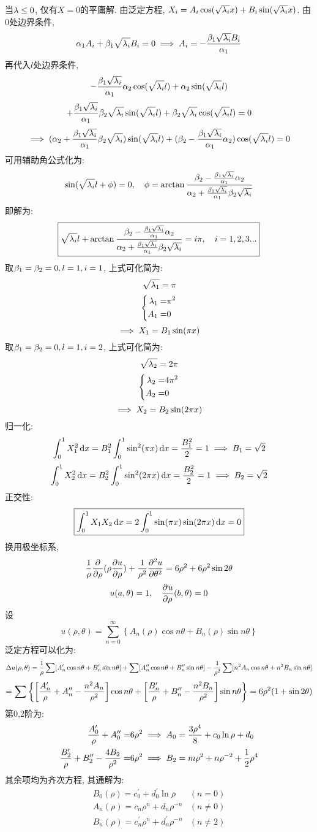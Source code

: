 \documentclass[UTF8,9pt]{ctexart}
\begin{document}
\newpage
{}
当$\lambda\leq 0$, 仅有$X=0$的平庸解. 
由泛定方程, $X_i=A_i\cos(\sqrt{\lambda_i}x)+B_i\sin(\sqrt{\lambda_i}x)$.
由0处边界条件, 
$$\alpha_1A_i +\beta_1\sqrt{\lambda_i}B_i = 0 \implies A_i = -\frac{\beta_1\sqrt{\lambda_i}B_i}{\alpha_1}$$
再代入$l$处边界条件,
$$-\frac{\beta_1\sqrt{\lambda_i}}{\alpha_1}\alpha_2\cos(\sqrt{\lambda_i}l)+\alpha_2\sin(\sqrt{\lambda_i}l)$$
$$+\frac{\beta_1\sqrt{\lambda_i}}{\alpha_1}\beta_2\sqrt{\lambda_i}\sin(\sqrt{\lambda_i}l)+\beta_2\sqrt{\lambda_i}\cos(\sqrt{\lambda_i}l)=0$$
$$\implies (\alpha_2+\frac{\beta_1\sqrt{\lambda_i}}{\alpha_1}\beta_2\sqrt{\lambda_i})\sin(\sqrt{\lambda_i}l)+(\beta_2-\frac{\beta_1\sqrt{\lambda_i}}{\alpha_1}\alpha_2)\cos(\sqrt{\lambda_i}l)=0$$
可用辅助角公式化为:
$$\sin(\sqrt{\lambda_i}l+\phi)=0,\quad \phi = \arctan\frac{\beta_2-\frac{\beta_1\sqrt{\lambda_i}}{\alpha_1}\alpha_2}{\alpha_2+\frac{\beta_1\sqrt{\lambda_i}}{\alpha_1}\beta_2\sqrt{\lambda_i}}$$
即解为: 
$$\boxed{ \sqrt{\lambda_i}l+\arctan\frac{\beta_2-\frac{\beta_1\sqrt{\lambda_i}}{\alpha_1}\alpha_2}{\alpha_2+\frac{\beta_1\sqrt{\lambda_i}}{\alpha_1}\beta_2\sqrt{\lambda_i}} = i\pi,\quad i=1,2,3...}$$
取$\beta_1=\beta_2=0,l=1,i=1$, 上式可化简为:
$$\sqrt{\lambda_1}=\pi$$
$$\left\{\begin{aligned} 
    \lambda_1=&\pi^2\\
    A_1=& 0
 \end{aligned}\right.$$
$$\implies X_1=B_1\sin(\pi x)$$
取$\beta_1=\beta_2=0,l=1,i=2$, 上式可化简为:
$$\sqrt{\lambda_2}=2\pi$$
$$\left\{\begin{aligned} 
    \lambda_2=&4\pi^2\\
    A_2=&0
 \end{aligned}\right.$$
$$\implies X_2=B_2\sin(2\pi x)$$
归一化:
$$\int_0^1 X_1^2\mathop{}\!\mathrm{d} x=B_1^2\int_0^1 \sin^2(\pi x)\mathop{}\!\mathrm{d} x = \frac{B_1^2}{2}=1 \implies B_1=\sqrt{2}$$
$$\int_0^1 X_2^2\mathop{}\!\mathrm{d} x=B_2^2\int_0^1 \sin^2(2\pi x)\mathop{}\!\mathrm{d} x = \frac{B_2^2}{2}=1 \implies B_2=\sqrt{2}$$
正交性: 
$$\boxed{ \int_0^1 X_1X_2 \mathop{}\!\mathrm{d} x=2\int_0^1 \sin(\pi x)\sin(2\pi x) \mathop{}\!\mathrm{d} x = 0 }$$
\newpage
{}
换用极坐标系, 
$$ 
\frac{1}{\rho} \frac{\partial}{\partial \rho}(\rho \frac{\partial u}{\partial \rho})+\frac{1}{\rho^{2}} \frac{\partial^{2} u}{\partial \theta^{2}} = 6\rho^2+6\rho^2\sin2\theta
 $$
$$u(a,\theta)=1,\quad \frac{\partial^{} u}{\partial {\rho}^{}}(b,\theta)=0$$
设
$$ 
u(\rho, \theta)=\sum_{n=0}^{\infty}\left\{A_{n}(\rho) \cos n \theta+B_{n}(\rho) \sin n \theta\right\}
 $$
泛定方程可以化为: 
$$\Delta u(\rho,\theta)=\frac{1}{\rho}\sum[A_n'\cos n\theta+B_n'\sin n\theta]+\sum[A_n''\cos n\theta+B_n''\sin n\theta]-\frac{1}{\rho^2}\sum[n^2A_n\cos n\theta+n^2B_n\sin n\theta]$$
$$=\sum\left\{ \left[\frac{A_n'}{\rho}+A_n''-\frac{n^2A_n}{\rho^2}\right]\cos n\theta + \left[\frac{B_n'}{\rho}+B_n''-\frac{n^2B_n}{\rho^2}\right]\sin n\theta  \right\} = 6\rho^2(1+\sin2\theta)$$
第0,2阶为: 
$$\begin{aligned} \frac{A_0'}{\rho}+A_0''=&\displaystyle 6\rho^2 \implies A_0=\frac{3\rho^4}{8}+c_0\ln\rho+d_0\\
\frac{B_2'}{\rho}+B_2''-\frac{4B_2}{\rho^2}=&6\rho^2 \implies B_2 = \displaystyle m\rho^{2}+n\rho^{-2}+\frac{1}{2}\rho^4
 \end{aligned}$$
其余项均为齐次方程, 其通解为:
$$ 
\begin{array}{ll}
{B_{0}(\rho)=c_{0}^{\prime}+d_{0}^{\prime} \ln \rho} & {(n=0)} \\ 
{A_{n}(\rho)=c_{n} \rho^{n}+d_{n} \rho^{-n}} & {(n \neq 0)} \\ 
{B_{n}(\rho)=c_{n}^{\prime} \rho^{n}+d_{n}^{\prime} \rho^{-n}} & {(n \neq 2)}
\end{array}
 $$
\end{document}
